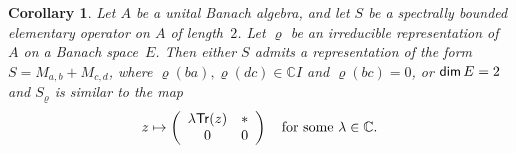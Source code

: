 \documentclass[a4paper,12pt,reqno]{amsart}
\numberwithin{equation}{section}
\newtheorem{cor}[thm]{Corollary}
\theoremstyle{definition}
\begin{document}
\begin{cor}\label{spb-2}
Let $A$ be a unital Banach algebra, and let $S$ be a spectrally bounded elementary operator on $A$ of length~$2$.
Let $\varrho$ be an irreducible representation of $A$ on a Banach space~$E$.
Then either $S$ admits a representation of the form $S= M_{a,b}+ M_{c,d}$, where $\varrho(ba), \varrho(dc) \in {\mathbb{C}} I$
and $\varrho(bc)=0$, or ${{\sf dim}\,} E=2$ and $S_\varrho$ is similar to the map
\begin{equation*}
z\mapsto \left(
            \begin{array}{cc}
              \lambda  {{\sf Tr}} (z)& * \\
              0 & 0 \\
            \end{array}
          \right)  \quad\text{for some }\lambda\in{\mathbb{C}}.
\end{equation*}
\end{cor}
\end{document}
